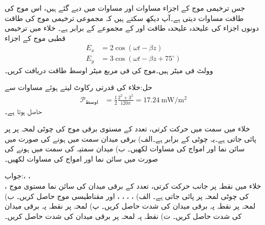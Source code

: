 جس ترخیمی موج کے اجزاء مساوات  اور مساوات  میں دیے گئے ہیں، اس موج کی طاقت مساوات  دیتی ہے۔آپ دیکھ سکتے ہیں کہ مجموعی ترخیمی موج کی طاقت دونوں اجزاء کی علیحدہ علیحدہ طاقت  اور  کے مجموعے کے برابر ہے۔
خلاء میں ترخیمی قطبی موج کے اجزاء
\begin{align*}
E_x&=2 \cos (\omega t -\beta z)\\
E_y&=3 \cos (\omega t -\beta z+75^{\circ})
\end{align*}
وولٹ فی میٹر ہیں۔موج کی فی مربع میٹر اوسط طاقت دریافت کریں۔

حل:خلاء کی قدرتی رکاوٹ  لیتے ہوئے مساوات 
سے
\begin{align*}
\mathscr{P}_{\text{اوسط}}&=\frac{1}{2} \frac{2^2+3^2}{120\pi}=\SI{17.24}{\milli \watt \per \meter \squared}
\end{align*}
حاصل ہوتا ہے۔

\newpage
{}

خلاء میں  سمت میں حرکت کرتی،  تعدد  کے مستوی برقی موج  کی  چوٹی لمحہ  پر   پر پائی جاتی ہے۔یہ چوٹی  کے برابر ہے۔الف) برقی میدان  سمت میں ہونے کی صورت میں سائن نما   اور  امواج کی مساوات لکھیں۔ ب) میدان سمتیہ  کی سمت میں ہونے کی صورت
 میں سائن نما   اور   امواج کی مساوات لکھیں۔

جواب:، ،\\ ،  
خلاء میں  نقطہ  پر  جانب حرکت کرتی،  تعدد کے برقی میدان کی سائن نما مستوی موج کی چوٹی لمحہ  پر  پائی جاتی ہے۔ الف) ، ، ، ،  اور مقناطیسی موج  حاصل کریں۔  ب) لمحہ  پر نقطہ  پہ برقی میدان کی شدت  حاصل کریں۔ پ) لمحہ  پر نقطہ  پہ برقی میدان کی شدت  حاصل کریں۔ ت) نقطہ  پہ لمحہ  پر برقی میدان کی شدت حاصل کریں۔ 


